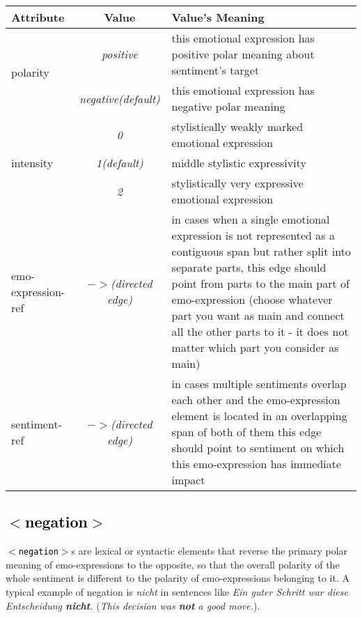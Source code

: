 \documentclass[11pt,a4paper]{article}
\newcommand{\xmltag}[1]{\textcolor{black}{{\small$<$#1$>$}}}
\begin{document}
\begin{tabular}{|l|c|p{}|}\hline
  Attribute & Value & Value's Meaning\\\hline

  \multirow{2}{*}{polarity} & \textit{positive} & this emotional
  expression has positive polar meaning about sentiment's
  target\\\cline{2-3}

  & \textit{negative\newline(default)} & this emotional expression has
  negative polar meaning\\\hline


  \multirow{3}{*}{intensity} & \textit{0} & stylistically weakly
  marked emotional expression\\\cline{2-3}

  & \textit{1\newline(default)} & middle stylistic
  expressivity\\\cline{2-3}

  & \textit{2} & stylistically very expressive emotional
  expression\\\hline


  emo-expression-ref & \textit{$->$\newline(directed edge)} & in cases
  when a single emotional expression is not represented as a
  contiguous span but rather split into separate parts, this edge
  should point from parts to the main part of emo-expression (choose
  whatever part you want as main and connect all the other parts to it
  - it does not matter which part you consider as main)\\\hline


  sentiment-ref & \textit{$->$\newline(directed edge)} & in cases
  multiple sentiments overlap each other and the emo-expression
  element is located in an overlapping span of both of them this edge
  should point to sentiment on which this emo-expression has immediate
  impact\\\hline
\end{tabular}


\subsection{\xmltag{negation}}
\texttt{\xmltag{negation}}s are lexical or syntactic elements that
reverse the primary polar meaning of emo-expressions to the opposite, so
that the overall polarity of the whole sentiment is different to the
polarity of emo-expressions belonging to it. A typical example of
negation is \textit{nicht} in sentences like \textit{Ein guter Schritt
  war diese Entscheidung \textbf{nicht}.} (\textit{This decision was
  \textbf{not} a good move.}).
\end{document}
